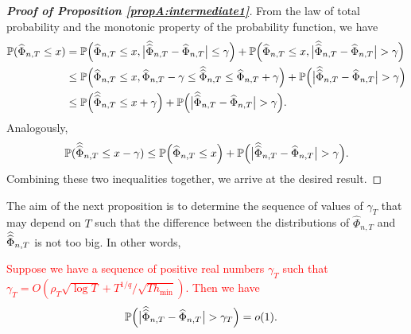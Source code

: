 \begin{proof}[\textnormal{\textbf{Proof of Proposition \ref{propA:intermediate1}}}] 
From the law of total probability and the monotonic property of the probability function, we have
\begin{align*} \mathbb{P}(\widehat{\Phi}_{n, T} \le x) &= \mathbb{P} \Big(\widehat{\Phi}_{n, T} \le x, \big|\widehat{\widehat{\Phi}}_{n,T} - \widehat{\Phi}_{n,T}\big| \le \gamma \Big) + \mathbb{P} \Big(\widehat{\Phi}_{n, T} \le x, \big|\widehat{\widehat{\Phi}}_{n,T} - \widehat{\Phi}_{n,T}\big| > \gamma \Big) \\
& \le  \mathbb{P} \Big(\widehat{\Phi}_{n, T} \le x, \widehat{\Phi}_{n,T} - \gamma \le \widehat{\widehat{\Phi}}_{n,T} \le \widehat{\Phi}_{n,T} + \gamma \Big) + \mathbb{P} \Big(\big|\widehat{\widehat{\Phi}}_{n,T} - \widehat{\Phi}_{n,T}\big| > \gamma \Big) \\
& \le  \mathbb{P} \Big(\widehat{\widehat{\Phi}}_{n,T} \le x + \gamma \Big) + \mathbb{P} \Big(\big|\widehat{\widehat{\Phi}}_{n,T} - \widehat{\Phi}_{n,T}\big| > \gamma \Big).
\end{align*}
Analogously, 
\begin{align*} \mathbb{P}(\widehat{\widehat{\Phi}}_{n, T} \le x - \gamma)  \le  \mathbb{P} \Big(\widehat{\Phi}_{n,T} \le x \Big) + \mathbb{P} \Big(\big|\widehat{\widehat{\Phi}}_{n,T} - \widehat{\Phi}_{n,T}\big| > \gamma \Big).
\end{align*}
Combining these two inequalities together, we arrive at the desired result.
\end{proof}

The aim of the next proposition is to determine the sequence of values of $\gamma_{T}$ that may depend on $T$ such that the difference between the distributions of $\widehat{\Phi}_{n, T}$ and $\widehat{\widehat{\Phi}}_{n, T}$ is not too big. In other words,

\begin{propA}\label{propA:intermediate2}
\textcolor{red}{Suppose we have a sequence of positive real numbers $\gamma_T$ such that $\gamma_{T} = O(\rho_T \sqrt{\log T} + T^{1/q}/\sqrt{T h_{\min}})$. Then we have}
\begin{align}\label{eq-intermediate-relation-2}
\mathbb{P} \Big(\big|\widehat{\widehat{\Phi}}_{n,T} &- \widehat{\Phi}_{n,T}\big| > \gamma_{T} \Big) = o(1).
\end{align}
\end{propA}

